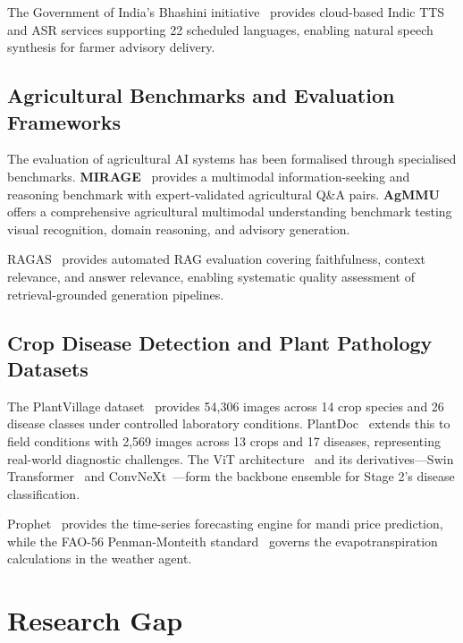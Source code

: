 \documentclass[12pt,a4paper]{article}
\begin{document}
The Government of India's Bhashini initiative~\cite{bhashini2023} provides cloud-based Indic TTS and ASR services supporting 22 scheduled languages, enabling natural speech synthesis for farmer advisory delivery.

\subsection{Agricultural Benchmarks and Evaluation Frameworks}

The evaluation of agricultural AI systems has been formalised through specialised benchmarks. \textbf{MIRAGE}~\cite{mirage2025} provides a multimodal information-seeking and reasoning benchmark with expert-validated agricultural Q\&A pairs. \textbf{AgMMU}~\cite{agmmu2025} offers a comprehensive agricultural multimodal understanding benchmark testing visual recognition, domain reasoning, and advisory generation.

RAGAS~\cite{ragas2023} provides automated RAG evaluation covering faithfulness, context relevance, and answer relevance, enabling systematic quality assessment of retrieval-grounded generation pipelines.

\subsection{Crop Disease Detection and Plant Pathology Datasets}

The PlantVillage dataset~\cite{plantvillage2019} provides 54,306 images across 14 crop species and 26 disease classes under controlled laboratory conditions. PlantDoc~\cite{plantdoc2020} extends this to field conditions with 2,569 images across 13 crops and 17 diseases, representing real-world diagnostic challenges. The ViT architecture~\cite{vit2021} and its derivatives---Swin Transformer~\cite{swinTransformer2021} and ConvNeXt~\cite{convnext2022}---form the backbone ensemble for Stage 2's disease classification.

Prophet~\cite{prophet2018} provides the time-series forecasting engine for mandi price prediction, while the FAO-56 Penman-Monteith standard~\cite{fao56penman1998} governs the evapotranspiration calculations in the weather agent.


\clearpage
\section{Research Gap}
\end{document}
